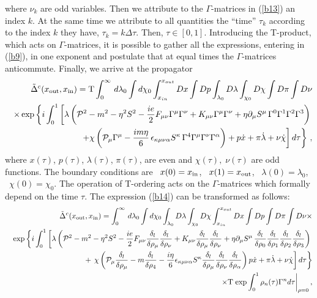 where $\nu_k$ are odd variables. Then we attribute
to the $\Gamma$-matrices in (\ref{b13}) an index $k$. 
At the same time we attribute to all quantities 
the ``time'' $\tau_k$ according to the index $k$ they have, 
$\tau_k=k\Delta\tau $. Then, $\tau \in [0,1]$. Introducing 
the T-product, which acts on $\Gamma$-matrices, it is possible 
to gather all the expressions, entering in (\ref{b9}), in one 
exponent and postulate that at equal times the $\Gamma$-matrices 
anticommute. Finally, we arrive at the 
propagator
\begin{eqnarray}
\label{b14}
&&\tilde{\Delta}^{c}(x_{\rm
out},x_{\rm in}) =  {\rm T}\int_0^\infty \, d\lambda_0
\int
d\chi_{0}\int_{x_{in}}^{x_{out}}Dx \int Dp
\int_{\lambda_0}D\lambda \int_{\chi_0}D\chi\int D\pi \int
D\nu \nonumber \\
&&\times\exp \left\{i\int_0^1 \left[ \lambda \left({\cal P}^2 -
m^2 - \eta^2S^2 -\frac{ie}{2}F_{\mu\nu}  \Gamma^\mu\Gamma^\nu
+K_{\mu\nu}\Gamma^\mu\Gamma^\nu + \eta\partial_\mu
S^\mu\,\Gamma^0\Gamma^1\Gamma^2\Gamma^3 \right)
\right.\right.  \nonumber \\
&&\left.\left. + \chi\left(
{\cal P}_\mu\Gamma^\mu -
\frac{im\eta}{6}\,\epsilon_{\kappa\mu\nu\alpha}S^{\kappa}
\,\Gamma^4\Gamma^{\mu}\Gamma^\nu\Gamma^\alpha\right)
+ p\dot{x} + \pi\dot{\lambda} + \nu\dot{\chi}\right]d\tau \right
\} \,, \end{eqnarray}
where   $x(\tau)$,  $p(\tau)$,  $\lambda(\tau)$,  $\pi(\tau)$,
are even and $\chi(\tau), \;\nu(\tau)$ are odd functions.
The boundary conditions are $\,\,\,x(0)=x_{\rm in}$,
$\,\,\,x(1)=x_{\rm out}$, $\,\,\,\lambda (0) = \lambda_0$,
$\,\,\,\chi(0) = \chi_0$. The operation of T-ordering
acts on the $\Gamma$-matrices which formally 
depend on the time $\tau$. The expression (\ref{b14}) can be
transformed as follows:
\begin{eqnarray*}
&& \tilde{\Delta}^{c}(x_{\rm out},x_{\rm in}) =
\int_0^\infty\,d\lambda_0 \int d\chi_{0}\int_{\lambda_0}D\lambda
\int_{\chi_0}D\chi  \int_{x_{in}}^{x_{out}}Dx
\int Dp     \int D\pi \int D\nu \times \\
&& \exp \left\{i\int_0^1 \left[
\lambda\left( {\cal P}^2 - m^2 - \eta^2 S^2 
 - \frac{ie}{2}F_{\mu\nu}
\frac{\delta_l}{\delta \rho_\mu}\frac{\delta_l}{\delta
\rho_\nu} +K_{\mu\nu}\frac{\delta_l}{\delta \rho_\mu}
\frac{\delta_l}{\delta \rho_\nu}
+\eta\partial_\mu S^\mu\, \frac{\delta_l}{\delta \rho_0}
\frac{\delta_l}{\delta \rho_1}
  \frac{\delta_l}{\delta \rho_2}
\frac{\delta_l}{\delta \rho_3}  \right)\right.\right. \\
&&+\left.\left. \chi\left(
{\cal P}_\mu \frac{\delta_l}{\delta \rho_\mu}
- m \frac{\delta_l}{\delta \rho_4}
-\frac{i\eta}{6}\epsilon_{\kappa\mu\nu\alpha}S^{\kappa}
\frac{\delta_l}{\delta \rho_\mu}
\frac{\delta_l}{\delta \rho_\nu}
 \frac{\delta_l}{\delta \rho_\alpha}     \right)
p\dot{x} + \pi\dot{\lambda} +
\nu\dot{\chi}\right]d\tau\right\} \\
&&\times{\rm T}\left.\exp
\int_0^1\rho_n(\tau)\Gamma^n d\tau \right|_{\rho=0},
\end{eqnarray*}
